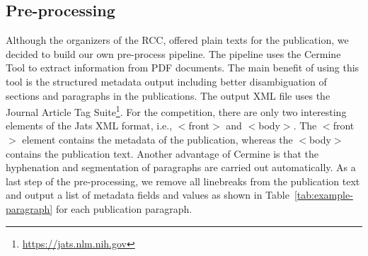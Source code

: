 




\subsection{Pre-processing}
\label{sec:prepro}
Although the organizers of the RCC, offered plain texts for the publication, we decided to build our own pre-process pipeline. The pipeline uses the Cermine Tool to extract information from PDF documents. The main benefit of using this tool is the structured metadata output including better disambiguation of sections and paragraphs in the publications. The output XML file uses the Journal Article Tag Suite\footnote{\url{https://jats.nlm.nih.gov}}. For the competition, there are only two interesting elements of the Jats XML format, i.e., $<$front$>$ and $<$body$>$. The $<$front$>$ element contains the metadata of the publication, whereas the $<$body$>$ contains the publication text. Another advantage of Cermine is that the hyphenation and segmentation of paragraphs are carried out automatically. 
As a last step of the pre-processing, we remove all linebreaks from the publication text and output a list of metadata fields and values as shown in Table~\ref{tab:example-paragraph} for each publication paragraph.

